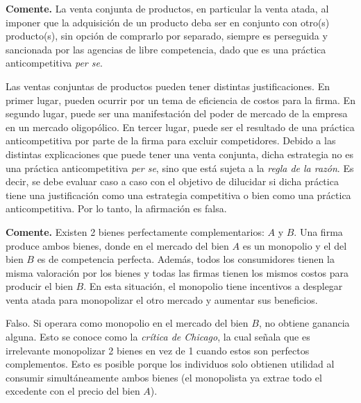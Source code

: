 \question \textbf{Comente.} La venta conjunta de productos, en particular la venta atada, al imponer que la adquisición de un producto deba ser en conjunto con otro(s) producto(s), sin opción de comprarlo por separado, siempre es perseguida y sancionada por las agencias de libre competencia, dado que es una práctica anticompetitiva \emph{per se}.
\begin{solution}
Las ventas conjuntas de productos pueden tener distintas justificaciones. En primer lugar, pueden ocurrir por un tema de eficiencia de costos para la firma. En segundo lugar, puede ser una manifestación del poder de mercado de la empresa en un mercado oligopólico. En tercer lugar, puede ser el resultado de una práctica anticompetitiva por parte de la firma para excluir competidores. Debido a las distintas explicaciones que puede tener una venta conjunta, dicha estrategia no es una práctica anticompetitiva \emph{per se}, sino que está sujeta a la \emph{regla de la razón}. Es decir, se debe evaluar caso a caso con el objetivo de dilucidar si dicha práctica tiene una justificación como una estrategia competitiva o bien como una práctica anticompetitiva. Por lo tanto, la afirmación es falsa.

\end{solution}

\question \textbf{Comente.} Existen 2 bienes perfectamente complementarios: $A$ y $B$. Una firma produce ambos bienes, donde en el mercado del bien $A$ es un monopolio y el del bien $B$ es de competencia perfecta. Además, todos los consumidores tienen la misma valoración por los bienes y todas las firmas tienen los mismos costos para producir el bien $B$. En esta situación, el monopolio tiene incentivos a desplegar venta atada para monopolizar el otro mercado y aumentar sus beneficios.
\begin{solution}
Falso. Si operara como monopolio en el mercado del bien $B$, no obtiene ganancia alguna. Esto se conoce como la \emph{crítica de Chicago}, la cual señala que es irrelevante monopolizar 2 bienes en vez de 1 cuando estos son perfectos complementos. Esto es posible porque los individuos solo obtienen utilidad al consumir simultáneamente ambos bienes (el monopolista ya extrae todo el excedente con el precio del bien $A$).

\end{solution}

